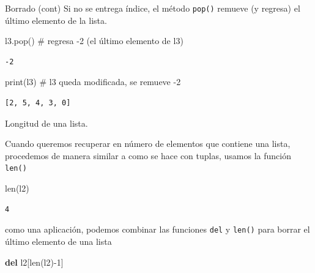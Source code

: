 \documentclass[
  ignorenonframetext,
  aspectratio=169,
  spanish,
]{beamer}
\newenvironment{Shaded}{\begin{snugshade}}{\end{snugshade}}
\newcommand{\BuiltInTok}[1]{\textcolor[rgb]{0.00,0.23,0.31}{#1}}
\newcommand{\CommentTok}[1]{\textcolor[rgb]{0.37,0.37,0.37}{#1}}
\newcommand{\DecValTok}[1]{\textcolor[rgb]{0.68,0.00,0.00}{#1}}
\newcommand{\KeywordTok}[1]{\textcolor[rgb]{0.00,0.23,0.31}{\textbf{#1}}}
\newcommand{\NormalTok}[1]{\textcolor[rgb]{0.00,0.23,0.31}{#1}}
\newcommand{\OperatorTok}[1]{\textcolor[rgb]{0.37,0.37,0.37}{#1}}
\begin{document}
\begin{frame}[fragile]{Borrado (cont)}
\label{borrado-cont-3}
Si no se entrega índice, el método \texttt{pop()} remueve (y regresa) el
último elemento de la lista.

\begin{Shaded}
\begin{Highlighting}[]
\NormalTok{l3.pop()  }\CommentTok{\# regresa {-}2 (el último elemento de l3)}
\end{Highlighting}
\end{Shaded}

\begin{verbatim}
-2
\end{verbatim}

\begin{Shaded}
\begin{Highlighting}[]
\BuiltInTok{print}\NormalTok{(l3) }\CommentTok{\# l3 queda modificada, se remueve {-}2   }
\end{Highlighting}
\end{Shaded}

\begin{verbatim}
[2, 5, 4, 3, 0]
\end{verbatim}
\end{frame}

\begin{frame}[fragile]{Longitud de una lista.}
\label{longitud-de-una-lista.}

Cuando queremos recuperar en número de elementos que contiene una lista,
procedemos de manera similar a como se hace con tuplas, usamos la
función \texttt{len()}

\begin{Shaded}
\begin{Highlighting}[]
\BuiltInTok{len}\NormalTok{(l2)}
\end{Highlighting}
\end{Shaded}

\begin{verbatim}
4
\end{verbatim}

como una aplicación, podemos combinar las funciones \texttt{del} y
\texttt{len()} para borrar el último elemento de una lista

\begin{Shaded}
\begin{Highlighting}[]
\KeywordTok{del}\NormalTok{ l2[}\BuiltInTok{len}\NormalTok{(l2)}\OperatorTok{{-}}\DecValTok{1}\NormalTok{] }
\end{Highlighting}
\end{Shaded}
\end{frame}
\end{document}
